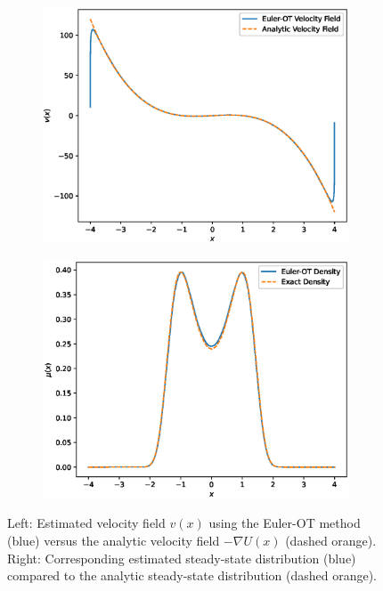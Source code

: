 \documentclass{article}
\begin{document}
\begin{figure}
    \centering
    \begin{subfigure}[b]{0.5\textwidth}
        \includegraphics[width=\textwidth]{figures/BimodalFlowVelocityField.eps}
    \end{subfigure}%
    \begin{subfigure}[b]{0.5\textwidth}
        \includegraphics[width=\textwidth]{figures/BimodalFlowDensity.eps}
    \end{subfigure}
    \caption{Left: Estimated velocity field $v(x)$ using the Euler-OT method (blue) versus the analytic velocity field $-\nabla U(x)$ (dashed orange). Right: Corresponding estimated steady-state distribution (blue) compared to the analytic steady-state distribution (dashed orange).}
    \label{fig:BimodalFlow}
\end{figure}
\end{document}
